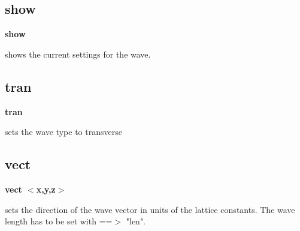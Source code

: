 \subsection*{show}
{\bf show \par }
\par
\vspace{3pt}
shows the current settings for the wave. 
\subsection*{tran}
{\bf tran \par }
\par
\vspace{3pt}
sets the wave type to transverse 
\subsection*{vect}
{\bf vect $ <$x,y,z$> $ \par }
\par
\vspace{3pt}
sets the direction of the wave vector in units of the lattice 
constants. The wave length has to be set with ==$> $ "len". 
